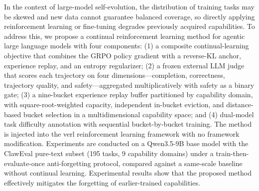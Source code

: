 \begin{abstracten}
In the context of large-model self-evolution, the distribution of training tasks may be skewed and new data cannot guarantee balanced coverage, so directly applying reinforcement learning or fine-tuning degrades previously acquired capabilities. To address this, we propose a continual reinforcement learning method for agentic large language models with four components: (1) a composite continual-learning objective that combines the GRPO policy gradient with a reverse-KL anchor, experience replay, and an entropy regularizer; (2) a frozen external LLM judge that scores each trajectory on four dimensions---completion, correctness, trajectory quality, and safety---aggregated multiplicatively with safety as a binary gate; (3) a nine-bucket experience replay buffer partitioned by capability domain, with square-root-weighted capacity, independent in-bucket eviction, and distance-based bucket selection in a multidimensional capability space; and (4) dual-model task difficulty annotation with sequential bucket-by-bucket training. The method is injected into the verl reinforcement learning framework with no framework modification. Experiments are conducted on a Qwen3.5-9B base model with the ClawEval pure-text subset (195 tasks, 9 capability domains) under a train-then-evaluate-once anti-forgetting protocol, compared against a same-scale baseline without continual learning. Experimental results show that the proposed method effectively mitigates the forgetting of earlier-trained capabilities.
\end{abstracten}
